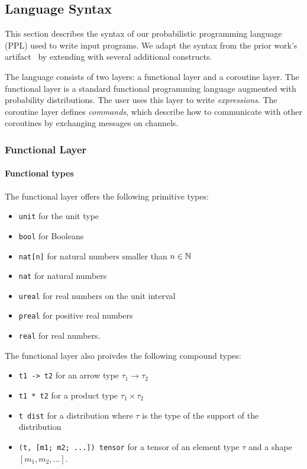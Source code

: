 \subsection{Language Syntax}

This section describes the syntax of our probabilistic programming language
(PPL) used to write input programs.
%
We adapt the syntax from the prior work's artifact~\citep{PLDI:WHR21B} by
extending with several additional constructs.

The language consists of two layers: a functional layer and a coroutine layer.
%
The functional layer is a standard functional programming language augmented
with probability distributions.
%
The user uses this layer to write \emph{expressions}.
%
The coroutine layer defines \emph{commands}, which describe how to communicate
with other coroutines by exchanging messages on channels.

\subsubsection{Functional Layer}

\paragraph{Functional types}

The functional layer offers the following primitive types:
\begin{itemize}
  \item \texttt{unit} for the unit type
  \item \texttt{bool} for Booleans
  \item \texttt{nat[n]} for natural numbers smaller than $n \in \mathbb{N}$
  \item \texttt{nat} for natural numbers
  \item \texttt{ureal} for real numbers on the unit interval
  \item \texttt{preal} for positive real numbers
  \item \texttt{real} for real numbers.
\end{itemize}
%
The functional layer also proivdes the following compound types:
\begin{itemize}
  \item \texttt{t1 -> t2} for an arrow type $\tau_1 \to \tau_2$
  \item \texttt{t1 * t2} for a product type $\tau_1 \times \tau_2$
  \item \texttt{t dist} for a distribution where $\tau$ is the type of the
        support of the distribution
  \item \texttt{(t, [m1; m2; ...]) tensor} for a tensor of an element type
        $\tau$ and a shape $[m_1, m_2, \ldots]$.
\end{itemize}

